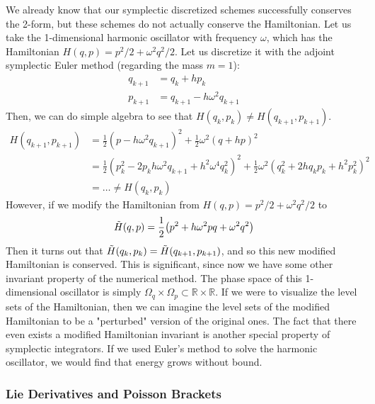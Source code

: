     We already know that our symplectic discretized schemes successfully conserves the 2-form, but these schemes do not actually conserve the Hamiltonian. Let us take the 1-dimensional harmonic oscillator with frequency $\omega$, which has the Hamiltonian $H(q, p) = p^2/2 + \omega^2 q^2/2$. Let us discretize it with the adjoint symplectic Euler method (regarding the mass $m = 1$): 
    \begin{align*}
      q_{k+1} & = q_k + h p_k \\ 
      p_{k+1} & = q_{k+1} - h \omega^2 q_{k+1}
    \end{align*}
    Then, we can do simple algebra to see that $H(q_k, p_k) \neq H(q_{k+1}, p_{k+1})$. 
    \begin{align*}
      H(q_{k+1}, p_{k+1}) & = \frac{1}{2} (p - h \omega^2 q_{k+1})^2 + \frac{1}{2} \omega^2 (q + h p)^2 \\
      & = \frac{1}{2} (p_k^2 - 2p_kh \omega^2 q_{k+1} + h^2 \omega^4 q_k^2)^2 + \frac{1}{2} \omega^2 (q_k^2 + 2hq_k p_k + h^2 p_k^2)^2 \\
      &  = \ldots \neq H(q_k, p_k) 
    \end{align*}
    However, if we modify the Hamiltonian from $H(q, p) = p^2 /2 + \omega^2 q^2 / 2$ to 
    \begin{equation}
      \Tilde{H} (q, p) = \frac{1}{2} \big( p^2 + h \omega^2 p q + \omega^2 q^2 \big)
    \end{equation}
    Then it turns out that $\Tilde{H}(q_k, p_k) = \Tilde{H}(q_{k+1}, p_{k+1})$, and so this new modified Hamiltonian is conserved. This is significant, since now we have some other invariant property of the numerical method. The phase space of this 1-dimensional oscillator is simply $\Omega_q \times \Omega_p \subset \mathbb{R} \times \mathbb{R}$. If we were to visualize the level sets of the Hamiltonian, then we can imagine the level sets of the modified Hamiltonian to be a "perturbed" version of the original ones. The fact that there even exists a modified Hamiltonian invariant is another special property of symplectic integrators. If we used Euler's method to solve the harmonic oscillator, we would find that energy grows without bound. 

    \subsubsection{Lie Derivatives and Poisson Brackets}

